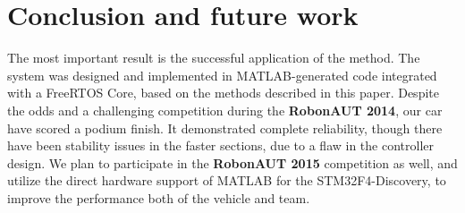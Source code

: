 \section{Conclusion and future work}

The most important result is the successful application of the method. The system was designed and implemented in \textsf{MATLAB}-generated code integrated with a \textsf{FreeRTOS} Core, based on the methods described in this paper. Despite the odds and a challenging competition during the \textbf{RobonAUT 2014}, our car have scored a podium finish. It demonstrated complete reliability, though there have been stability issues in the faster sections, due to a flaw in the controller design. We plan to participate in the \textbf{RobonAUT 2015} competition as well, and utilize the direct hardware support of \textsf{MATLAB} for the \textsf{STM32F4-Discovery}, to improve the performance both of the vehicle and team.